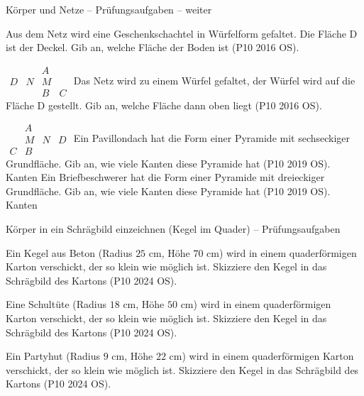 \begin{aufgabe}{Körper und Netze – Prüfungsaufgaben – weiter}
\begin{teile}
\teil Aus dem Netz wird eine Geschenkschachtel in Würfelform gefaltet. Die Fläche D ist der Deckel. Gib an, welche Fläche der Boden ist \hfill (P10 2016 OS).

$\begin{array}{cccc}  &  & A &  \\ D & N & M &  \\  &  & B & C \end{array}$
\leerfeld
\teil Das Netz wird zu einem Würfel gefaltet, der Würfel wird auf die Fläche D gestellt. Gib an, welche Fläche dann oben liegt \hfill (P10 2016 OS).

$\begin{array}{cccc}  & A &  &  \\  & M & N & D \\ C & B &  &  \end{array}$
\leerfeld
\teil Ein Pavillondach hat die Form einer Pyramide mit sechseckiger Grundfläche. Gib an, wie viele Kanten diese Pyramide hat \hfill (P10 2019 OS). \leerfeld Kanten
\teil Ein Briefbeschwerer hat die Form einer Pyramide mit dreieckiger Grundfläche. Gib an, wie viele Kanten diese Pyramide hat \hfill (P10 2019 OS). \leerfeld Kanten
\end{teile}
\end{aufgabe}

\begin{aufgabe}{Körper in ein Schrägbild einzeichnen (Kegel im Quader) – Prüfungsaufgaben}
\begin{teile}
\teil Ein Kegel aus Beton (Radius $25$ cm, Höhe $70$ cm) wird in einem quaderförmigen Karton verschickt, der so klein wie möglich ist. Skizziere den Kegel in das Schrägbild des Kartons \hfill (P10 2024 OS).

\teil Eine Schultüte (Radius $18$ cm, Höhe $50$ cm) wird in einem quaderförmigen Karton verschickt, der so klein wie möglich ist. Skizziere den Kegel in das Schrägbild des Kartons \hfill (P10 2024 OS).

\teil Ein Partyhut (Radius $9$ cm, Höhe $22$ cm) wird in einem quaderförmigen Karton verschickt, der so klein wie möglich ist. Skizziere den Kegel in das Schrägbild des Kartons \hfill (P10 2024 OS).

\end{teile}
\end{aufgabe}

